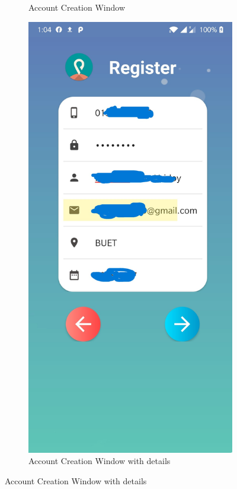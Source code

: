 \documentclass[12pt, english]{article}
\begin{document}
\begin{figure}[h!]
\begin{subfigure}[t]{0.4\textwidth}
     \caption{Account Creation Window}
    \end{subfigure}
    \begin{subfigure}[t]{0.4\textwidth}
    \includegraphics[width=\linewidth]{Account_Creation/CreateAccountActivity_when_details_given.jpg}
    \caption{Account Creation Window with details}
    \end{subfigure}
    \label{fig:arp_os}
\end{figure}
\end{document}
